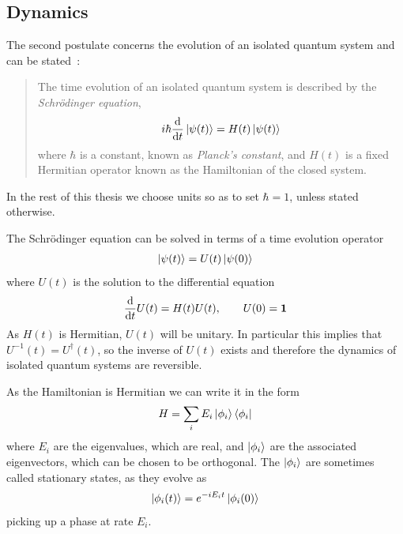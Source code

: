 \subsection{Dynamics}

The second postulate concerns the evolution of an isolated quantum system and can be stated~\cite{nielsen+chuang}:
\begin{quotation}
The time evolution of an isolated quantum system is described by the \textit{Schr\"odinger equation},
\begin{align}
  \label{qd:schrodinger_eq}
  i\hbar\frac{\mathrm{d}}{\mathrm{d}t} \left\vert\psi(t)\right\rangle = H(t) \left\vert\psi(t)\right\rangle
\end{align}
where $\hbar$ is a constant, known as \textit{Planck's constant}, and $H(t)$ is a fixed Hermitian operator known as the Hamiltonian of the closed system.
\end{quotation}
In the rest of this thesis we choose units so as to set $\hbar = 1$, unless stated otherwise. 

The Schr\"odinger equation can be solved in terms of a time evolution operator
\begin{align}
  \left\vert\psi(t)\right\rangle = U(t)\left\vert\psi(0)\right\rangle
\end{align}
where $U(t)$ is the solution to the differential equation
\begin{align}
  \frac{\mathrm{d}}{\mathrm{d}t} U(t) = H(t)U(t), \qquad U(0) = \mathbf{1}
\end{align}
As $H(t)$ is Hermitian, $U(t)$ will be unitary. In particular this implies that $U^{-1}(t) = U^\dagger(t)$, so the inverse of $U(t)$ exists and therefore the dynamics of isolated quantum systems are reversible.

As the Hamiltonian is Hermitian we can write it in the form
\begin{align}
  H = \sum_i E_i \left\vert\phi_i\right\rangle\left\langle \phi_i\right\vert
\end{align}
where $E_i$ are the eigenvalues, which are real, and $\left\vert\phi_i\right\rangle$ are the associated eigenvectors, which can be chosen to be orthogonal. The $\left\vert\phi_i\right\rangle$ are sometimes called stationary states, as they evolve as
\begin{align}
  \left\vert\phi_i(t)\right\rangle = e^{-i E_i t}\left\vert\phi_i(0)\right\rangle
\end{align}
picking up a phase at rate $E_i$.

